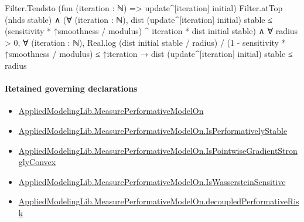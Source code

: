 \documentclass[10pt]{article}
\begin{document}
\begin{ReviewVerbatim}
                                  Filter.Tendsto (fun (iteration : ℕ) => update^[iteration] initial) Filter.atTop
                                      (nhds stable) ∧
                                    (∀ (iteration : ℕ),
                                        dist (update^[iteration] initial) stable ≤
                                          (sensitivity * ↑smoothness / modulus) ^ iteration * dist initial stable) ∧
                                      ∀ radius > 0,
                                        ∀ (iteration : ℕ),
                                          Real.log (dist initial stable / radius) /
                                                (1 - sensitivity * ↑smoothness / modulus) ≤
                                              ↑iteration →
                                            dist (update^[iteration] initial) stable ≤ radius
\end{ReviewVerbatim}

\paragraph{Retained governing declarations}
\begin{itemize}\raggedright
\item \hyperlink{library-prerequisite-e14cc5e8b1e1460e}{Applied\allowbreak{}Modeling\allowbreak{}Lib.\allowbreak{}Measure\allowbreak{}Performative\allowbreak{}Model\allowbreak{}On}
\item \hyperlink{library-prerequisite-4af6c70f954a80a0}{Applied\allowbreak{}Modeling\allowbreak{}Lib.\allowbreak{}Measure\allowbreak{}Performative\allowbreak{}Model\allowbreak{}On.\allowbreak{}Is\allowbreak{}Performatively\allowbreak{}Stable}
\item \hyperlink{library-prerequisite-eb9ab8e4235e1d28}{Applied\allowbreak{}Modeling\allowbreak{}Lib.\allowbreak{}Measure\allowbreak{}Performative\allowbreak{}Model\allowbreak{}On.\allowbreak{}Is\allowbreak{}Pointwise\allowbreak{}Gradient\allowbreak{}Strongly\allowbreak{}Convex}
\item \hyperlink{library-prerequisite-0e1e192eee739a4b}{Applied\allowbreak{}Modeling\allowbreak{}Lib.\allowbreak{}Measure\allowbreak{}Performative\allowbreak{}Model\allowbreak{}On.\allowbreak{}Is\allowbreak{}Wasserstein\allowbreak{}Sensitive}
\item \hyperlink{library-prerequisite-25221c4f931beacb}{Applied\allowbreak{}Modeling\allowbreak{}Lib.\allowbreak{}Measure\allowbreak{}Performative\allowbreak{}Model\allowbreak{}On.\allowbreak{}decoupled\allowbreak{}Performative\allowbreak{}Risk}
\end{itemize}
\end{document}
